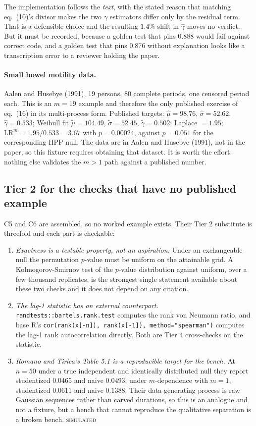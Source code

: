 \documentclass[11pt,a4paper]{article}
\newcommand{\gh}{\hat\gamma}
\newcommand{\SIMULATED}{\textsc{\textcolor{orange!70!black}{simulated}}}
\begin{document}
The implementation follows the \emph{text}, with the stated reason that matching
eq.~(10)'s divisor makes the two $\gamma$ estimators differ only by the residual term.
That is a defensible choice and the resulting $1.4\%$ shift in $\gh$ moves no verdict.
But it must be recorded, because a golden test that pins $0.888$ would fail against
correct code, and a golden test that pins $0.876$ without explanation looks like a
transcription error to a reviewer holding the paper.

\paragraph{Small bowel motility data.} Aalen and Husebye (1991), 19 persons, 80 complete
periods, one censored period each. This is an $m=19$ example and therefore the only
published exercise of eq.~(16) in its multi-process form. Published targets:
$\hat\mu = 98.76$, $\hat\sigma = 52.62$, $\gh = 0.533$; Weibull fit
$\tilde\mu = 104.49$, $\tilde\sigma = 52.45$, $\tilde\gamma = 0.502$; Laplace $=1.95$;
$\mathrm{LR}^m = 1.95/0.533 = 3.67$ with $p = 0.00024$, against $p = 0.051$ for the
corresponding HPP null. The data are in Aalen and Husebye (1991), not in the paper, so
this fixture requires obtaining that dataset. It is worth the effort: nothing else
validates the $m>1$ path against a published number.

\subsection{Tier 2 for the checks that have no published example}

C5 and C6 are assembled, so no worked example exists. Their Tier 2 substitute is
threefold and each part is checkable:

\begin{enumerate}[leftmargin=1.6em,itemsep=2pt]
\item \emph{Exactness is a testable property, not an aspiration.} Under an exchangeable
null the permutation $p$-value must be uniform on the attainable grid. A
Kolmogorov-Smirnov test of the $p$-value distribution against uniform, over a few
thousand replicates, is the strongest single statement available about these two checks
and it does not depend on any citation.
\item \emph{The lag-1 statistic has an external counterpart.} \texttt{randtests::bartels.rank.test}
computes the rank von Neumann ratio, and base R's
\texttt{cor(rank(x[-n]), rank(x[-1]), method="spearman")} computes the lag-1 rank
autocorrelation directly. Both are Tier 4 cross-checks on the statistic.
\item \emph{Romano and Tirlea's Table 5.1 is a reproducible target for the bench.} At
$n=50$ under a true independent and identically distributed null they report studentized
$0.0465$ and naive $0.0493$; under $m$-dependence with $m=1$, studentized $0.0611$ and
naive $0.1388$. Their data-generating process is raw Gaussian sequences rather than
carved durations, so this is an analogue and not a fixture, but a bench that cannot
reproduce the qualitative separation is a broken bench. \SIMULATED
\end{enumerate}
\end{document}
